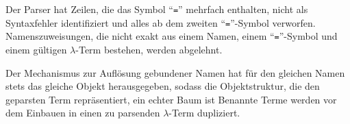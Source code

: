 \documentclass[parskip=full,11pt,openany]{scrreprt}
\begin{document}
\begin{itemize}[itemsep=3ex]
{Der Parser hat Zeilen, die das Symbol \enquote{\texttt{=}} mehrfach enthalten, nicht als Syntaxfehler identifiziert und
alles ab dem zweiten \enquote{\texttt{=}}-Symbol verworfen.}
{Namenszuweisungen, die nicht exakt aus einem Namen, einem \enquote{\texttt{=}}-Symbol und einem gültigen
$\lambda$-Term bestehen, werden abgelehnt.}

\issue{}{}{}

{}
{}

\issue{}{}{}

\issue{}{}{}

{Der Mechanismus zur Auflösung gebundener Namen hat für den gleichen Namen stets das gleiche Objekt
herausgegeben, sodass die Objektstruktur, die den geparsten Term repräsentiert, ein echter Baum ist}
{Benannte Terme werden vor dem Einbauen in einen zu parsenden $\lambda$-Term dupliziert.}

\end{itemize}
\end{document}

